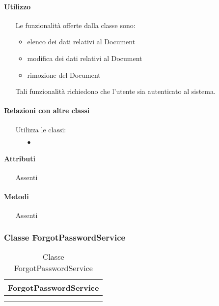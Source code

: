 \paragraph*{Utilizzo}
\begin{itemize}
\item[] Le funzionalità offerte dalla classe sono: 
\begin{itemize} 
\item elenco dei dati relativi al Document 
\item modifica dei dati relativi al Document
\item rimozione del Document 
\end{itemize} 
Tali funzionalità richiedono che l'utente sia autenticato al sistema.
\end{itemize}

\paragraph*{Relazioni con altre classi}
\begin{itemize}


\item[] Utilizza le classi:
\begin{itemize}
\item[$\bullet$] 
\end{itemize}
\end{itemize}

\paragraph*{Attributi}
\begin{itemize}
\item[] Assenti
\end{itemize}

\paragraph*{Metodi}
\begin{itemize}
\item[] Assenti
\end{itemize}

\subsubsection{Classe ForgotPasswordService}

\begin{table}[ht]
\begin{center}
\bgroup
\setlength{\arrayrulewidth}{0.6mm}
\def\arraystretch{1}
\begin{tabular}{ | p{12cm} | }
\hline
\centerline{\textbf{ForgotPasswordService}}
\\ \hline
 \\ 
\hline
 \\ 
\hline
\end{tabular}
\egroup
\caption{Classe ForgotPasswordService}
\end{center}
\end{table}


